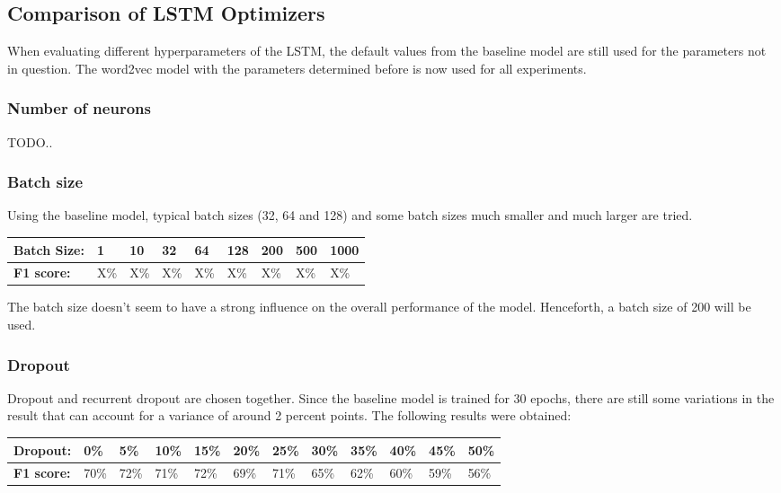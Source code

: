\documentclass[
	a4paper,
	pagesize,
	pdftex,
	12pt,
	twoside, %
	BCOR=5mm, %
	ngerman,
	fleqn,
	final,
	]{scrartcl}
\begin{document}
\subsection{Comparison of LSTM Optimizers}

When evaluating different hyperparameters of the LSTM, the default values from the baseline model are still used for the parameters not in question. The word2vec model with the parameters determined before is now used for all experiments.

\subsubsection{Number of neurons}

TODO..

\subsubsection{Batch size}

Using the baseline model, typical batch sizes (32, 64 and 128) and some batch sizes much smaller and much larger are tried.

\begin{tabular} { | p{3cm} | p{0.8cm} | p{0.8cm} |  p{0.8cm} | p{0.8cm}  | p{0.8cm} | p{0.8cm} | p{0.8cm}| p{0.8cm} |}
	\hline
	\textbf{Batch Size:}  & 1 & 10 & 32 & 64 & 128 & 200 & 500 & 1000\\   
	\hline
	\textbf{F1 score:} & X\% & X\% & X\% & X\% & X\% & X\% & X\% & X\% \\
	\hline
\end{tabular}

The batch size doesn't seem to have a strong influence on the overall performance of the model. Henceforth, a batch size of 200 will be used.

\subsubsection{Dropout}

Dropout and recurrent dropout are chosen together. Since the baseline model is trained for 30 epochs, there are still some variations in the result that can account for a variance of around 2 percent points. The following results were obtained:

\begin{tabular} { | p{2cm} | p{0.8cm} | p{0.8cm} | p{0.8cm} | p{0.8cm}  | p{0.8cm} | p{0.8cm} | p{0.8cm} | p{0.8cm} | p{0.8cm} | p{0.8cm} | p{0.8cm} |}
\hline
\textbf{Dropout:}  & 0\% & 5\% & 10\% & 15\%   & 20\% & 25\% & 30\%   & 35\% & 40\% & 45\% & 50\% \\   
\hline
\textbf{F1 score:} & 70\% & 72\% & 71\% & 72\% & 69\% & 71\% & 65\% & 62\% & 60\% & 59\% & 56\% \\
\hline
\end{tabular}
\end{document}
